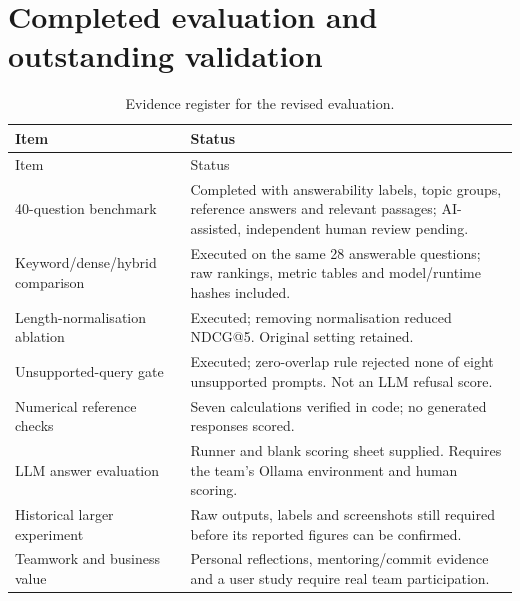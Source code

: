 \documentclass[11pt,a4paper]{article}
\begin{document}
\section{Completed evaluation and outstanding validation}
\begin{longtable}{p{38mm}p{110mm}}
\caption{Evidence register for the revised evaluation.}\\
\toprule Item & Status\\\midrule\endfirsthead
\toprule Item & Status\\\midrule\endhead
40-question benchmark & Completed with answerability labels, topic groups, reference answers and relevant passages; AI-assisted, independent human review pending.\\
Keyword/dense/hybrid comparison & Executed on the same 28 answerable questions; raw rankings, metric tables and model/runtime hashes included.\\
Length-normalisation ablation & Executed; removing normalisation reduced NDCG@5. Original setting retained.\\
Unsupported-query gate & Executed; zero-overlap rule rejected none of eight unsupported prompts. Not an LLM refusal score.\\
Numerical reference checks & Seven calculations verified in code; no generated responses scored.\\
LLM answer evaluation & Runner and blank scoring sheet supplied. Requires the team's Ollama environment and human scoring.\\
Historical larger experiment & Raw outputs, labels and screenshots still required before its reported figures can be confirmed.\\
Teamwork and business value & Personal reflections, mentoring/commit evidence and a user study require real team participation.\\\bottomrule
\end{longtable}

\endgroup
\end{document}
